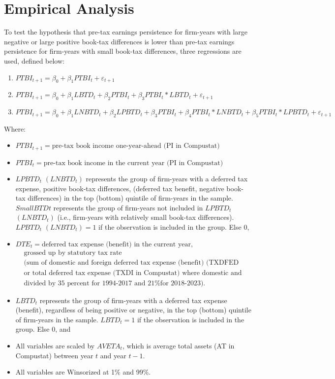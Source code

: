 \documentclass{article}
\begin{document}
\section{Empirical Analysis}
To test the hypothesis that pre-tax earnings persistence for firm-years with large negative or large positive book-tax differences is lower than pre-tax earnings persistence for firm-years with small book-tax differences, three regressions are used, defined below:
\begin{enumerate}
    \item $PTBI_{t+1} = \beta_0 + \beta_1PTBI_t + \varepsilon_{t+1}$
    \item $PTBI_{t+1} = \beta_0 + \beta_1LBTD_t + \beta_2PTBI_t + \beta_3PTBI_t * LBTD_t + \varepsilon_{t+1}$
    \item $PTBI_{t+1} = \beta_0 + \beta_1LNBTD_t + \beta_2LPBTD_t + \beta_3PTBI_t + \beta_4PTBI_t * LNBTD_t + \beta_5PTBI_t * LPBTD_t + \varepsilon_{t+1}$
\end{enumerate}
Where:
\begin{itemize}
    \item $PTBI_{t+1} = \text{pre-tax book income one-year-ahead (PI in Compustat)}$
    \item $PTBI_t = \text{pre-tax book income in the current year (PI in Compustat)}$
    \item $LPBTD_t$ $(LNBTD_t)$ represents the group of firm-years with a deferred tax expense, positive book-tax differences, (deferred tax benefit, negative book-tax differences) in the top (bottom) quintile of firm-years in the sample. $SmallBTDt$  represents the group of firm-years not included in $LPBTD_t$ $(LNBTD_t)$ (i.e., firm-years with relatively small book-tax differences). $LPBTD_t$ $(LNBTD_t) = 1$ if the observation is included in the group. Else $0$,
    \item $DTE_t = \text{deferred tax expense (benefit) in the current year,}$
\begin{align*}
&\text{grossed up by statutory tax rate} \\
&\text{(sum of domestic and foreign deferred tax expense (benefit) (TXDFED and TXDFO in Compustat respectively),} \\
&\text{or total deferred tax expense (TXDI in Compustat) where domestic and foreign deferred tax expense are missing,} \\
&\text{divided by 35 percent for 1994-2017 and 21\% for 2018-2023).}
\end{align*}

    \item $LBTD_t$ represents the group of firm-years with a deferred tax expense (benefit), regardless of being positive or negative, in the top (bottom) quintile of firm-years in the sample. $LBTD_t = 1$ if the observation is included in the group. Else $0$, and
    \item All variables are scaled by $AVETA_t$, which is average total assets (AT in Compustat) between year $t$ and year $t-1$.
    \item All variables are Winsorized at 1\% and 99\%.
\end{itemize}
\end{document}
